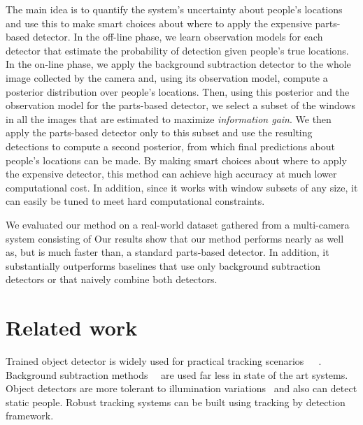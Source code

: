 \documentclass[10pt,twocolumn,letterpaper]{article}
\begin{document}
The main idea is to quantify the system's uncertainty about people's locations and use this to make smart choices about where to apply the expensive parts-based detector.  In the off-line phase, we learn observation models for each detector that estimate the probability of detection given people's true locations.  In the on-line phase, we apply the background subtraction detector to the whole image collected by the camera and, using its observation model, compute a posterior distribution over people's locations.  Then, using this posterior and the observation model for the parts-based detector, we select a subset of the windows in all the images that are estimated to maximize \emph{information gain}.  We then apply the parts-based detector only to this subset and use the resulting detections to compute a second posterior, from which final predictions about people's locations can be made.  By making smart choices about where to apply the expensive detector, this method can achieve high accuracy at much lower computational cost.  In addition, since it works with window subsets of any size, it can easily be tuned to meet hard computational constraints.  

We evaluated our method on a real-world dataset gathered from a multi-camera system  consisting of   Our results show that our method performs nearly as well as, but is much faster than, a standard parts-based detector.  In addition, it substantially outperforms baselines that use only background subtraction detectors or that naively combine both detectors.

\section {Related work} 

Trained object detector is widely used for practical tracking scenarios~\cite{Pami-11}~\cite{POM-main}~\cite{MIL-obj1}. Background subtraction methods~\cite{bk1}~\cite{bk2-bayesian} are used far less in state of the art systems. Object detectors are more tolerant to illumination variations~\cite{ObjDet-1} and also can detect static people. Robust tracking systems can be built using  tracking by detection framework.
\end{document}
